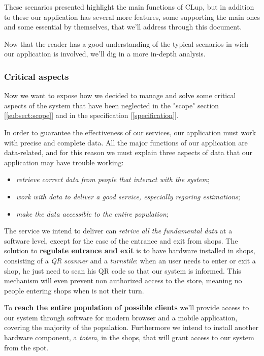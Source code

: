 These scenarios presented highlight the main functions of CLup, but in addition to these our application has several more features, some supporting the main ones and some essential by themselves, that we'll address through this document.

Now that the reader has a good understanding of the typical scenarios in wich our application is involved, we'll dig in a more in-depth analysis.

\subsubsection{Critical aspects}
\label{subsubsect:criticalaspects}

Now we want to expose how we decided to manage and solve some critical aspects of the system that have been neglected in the "scope" section [\ref{subsect:scope}] and in the specification [\ref{specification}].

In order to guarantee the effectiveness of our services, our application must work with precise and complete data. All the major functions of our application are data-related, and for this reason we must explain three aspects of data that our application may have trouble working:
\begin{itemize}[topsep=0pt]
    \item \textit{retrieve correct data from people that interact with the system};
    \item \textit{work with data to deliver a good service, especially regaring estimations};
    \item \textit{make the data accessible to the entire population};
\end{itemize}

The service we intend to deliver can \textit{retrive all the fundamental data} at a software level, except for the case of the entrance and  exit from shops. The solution to \textbf{regulate entrance and exit} is to have hardware installed in shops, consisting of a \textit{QR scanner} and a \textit{turnstile}: when an user needs to enter or exit a shop, he just need to scan his QR code so that our system is informed. This mechanism will even prevent non authorized access to the store, meaning no people entering shops when is not their turn.

To \textbf{reach the entire population of possible clients} we'll provide access to our system through software for modern browser and a mobile application, covering the majority of the population. Furthermore we intend to install another hardware component, a \textit{totem}, in the shops, that will grant access to our system from the spot.

